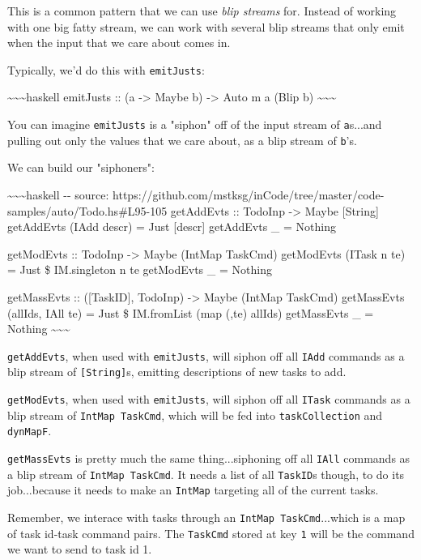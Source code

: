 \documentclass[]{article}
\begin{document}
This is a common pattern that we can use \emph{blip streams} for. Instead of
working with one big fatty stream, we can work with several blip streams that
only emit when the input that we care about comes in.

Typically, we'd do this with \texttt{emitJusts}:

\textasciitilde{}\textasciitilde{}\textasciitilde{}haskell emitJusts :: (a
-\textgreater{} Maybe b) -\textgreater{} Auto m a (Blip b)
\textasciitilde{}\textasciitilde{}\textasciitilde{}

You can imagine \texttt{emitJusts} is a "siphon" off of the input stream of
\texttt{a}s...and pulling out only the values that we care about, as a blip
stream of \texttt{b}'s.

We can build our "siphoners":

\textasciitilde{}\textasciitilde{}\textasciitilde{}haskell -\/- source:
https://github.com/mstksg/inCode/tree/master/code-samples/auto/Todo.hs\#L95-105
getAddEvts :: TodoInp -\textgreater{} Maybe {[}String{]} getAddEvts (IAdd descr)
= Just {[}descr{]} getAddEvts \_ = Nothing

getModEvts :: TodoInp -\textgreater{} Maybe (IntMap TaskCmd) getModEvts (ITask n
te) = Just \$ IM.singleton n te getModEvts \_ = Nothing

getMassEvts :: ({[}TaskID{]}, TodoInp) -\textgreater{} Maybe (IntMap TaskCmd)
getMassEvts (allIds, IAll te) = Just \$ IM.fromList (map (,te) allIds)
getMassEvts \_ = Nothing \textasciitilde{}\textasciitilde{}\textasciitilde{}

\texttt{getAddEvts}, when used with \texttt{emitJusts}, will siphon off all
\texttt{IAdd} commands as a blip stream of \texttt{{[}String{]}}s, emitting
descriptions of new tasks to add.

\texttt{getModEvts}, when used with \texttt{emitJusts}, will siphon off all
\texttt{ITask} commands as a blip stream of \texttt{IntMap\ TaskCmd}, which will
be fed into \texttt{taskCollection} and \texttt{dynMapF}.

\texttt{getMassEvts} is pretty much the same thing...siphoning off all
\texttt{IAll} commands as a blip stream of \texttt{IntMap\ TaskCmd}. It needs a
list of all \texttt{TaskID}s though, to do its job...because it needs to make an
\texttt{IntMap} targeting all of the current tasks.

Remember, we interace with tasks through an \texttt{IntMap\ TaskCmd}...which is
a map of task id-task command pairs. The \texttt{TaskCmd} stored at key
\texttt{1} will be the command we want to send to task id 1.
\end{document}
